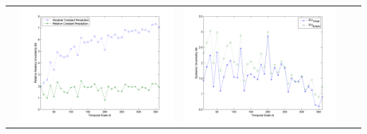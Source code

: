 \documentclass[11pt]{article}
\begin{document}
\begin{table}[H]
{\begin{tabular}{c  c   c   c  c }
&\begin{minipage}{.4\textwidth}\includegraphics[width=\linewidth]{resultgraph/07019000AU.png}\end{minipage}
&\begin{minipage}{.4\textwidth}\includegraphics[width=\linewidth]{resultgraph/07019000EU.png}\end{minipage}
\\

\end{tabular}}
\end{table}
\end{document}
